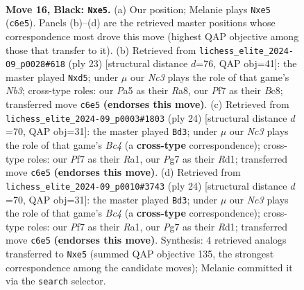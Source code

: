 \documentclass[11pt]{article}
\begin{document}
\clearpage

\begin{figure}[p]\centering
\begin{subfigure}{0.46\textwidth}\centering
\resizebox{\linewidth}{!}{%
\newchessgame
\chessboard[
  setfen={r1b1kb1r/2q2ppp/1pn5/p3P3/3p3P/1Q3N2/PP3PP1/RNB2RK1 b q - 3 16},
  showmover=false,
  pgfstyle=straightmove, color=movearrow, markmove={c6-e5}
]}
\caption{}
\end{subfigure}\hfill
\begin{subfigure}{0.46\textwidth}\centering
\resizebox{\linewidth}{!}{%
\newchessgame
\chessboard[
  setfen={r1bqkb1r/pp3ppp/1n2p3/3PN3/8/1QN5/PP3PPP/R1B1K2R b KQkq - 0 12},
  showmover=false,
  pgfstyle=straightmove, color=movearrow, markmove={b6-d5}
]}
\caption{}
\end{subfigure}
\\[4pt]
\begin{subfigure}{0.46\textwidth}\centering
\resizebox{\linewidth}{!}{%
\newchessgame
\chessboard[
  setfen={rn3rk1/pbq2ppp/1p2pn2/8/2BP4/2P2N2/P3QPPP/R1BR2K1 w - - 1 13},
  showmover=false,
  pgfstyle=straightmove, color=movearrow, markmove={c4-d3}
]}
\caption{}
\end{subfigure}\hfill
\begin{subfigure}{0.46\textwidth}\centering
\resizebox{\linewidth}{!}{%
\newchessgame
\chessboard[
  setfen={rn3rk1/pbq2ppp/1p2pn2/8/2BP4/2P2N2/P3QPPP/R1BR2K1 w - - 1 13},
  showmover=false,
  pgfstyle=straightmove, color=movearrow, markmove={c4-d3}
]}
\caption{}
\end{subfigure}
\caption{\textbf{Move 16, Black: \texttt{Nxe5}.} (a) Our position; Melanie plays \texttt{Nxe5} (\texttt{c6e5}). Panels (b)--(d) are the retrieved master positions whose correspondence most drove this move (highest QAP objective among those that transfer to it). (b) Retrieved from \texttt{lichess\_elite\_2024-09\_p0028\#618} (ply 23) [structural distance $d$=76, QAP obj=41]: the master played \texttt{Nxd5}; under $\mu$ our \emph{Nc3} plays the role of that game's \emph{Nb3}; cross-type roles: our \emph{P}a5 as their \emph{R}a8, our \emph{P}f7 as their \emph{B}c8; transferred move \texttt{c6e5} \textbf{(endorses this move)}. (c) Retrieved from \texttt{lichess\_elite\_2024-09\_p0003\#1803} (ply 24) [structural distance $d$=70, QAP obj=31]: the master played \texttt{Bd3}; under $\mu$ our \emph{Nc3} plays the role of that game's \emph{Bc4} (a \textbf{cross-type} correspondence); cross-type roles: our \emph{P}f7 as their \emph{R}a1, our \emph{P}g7 as their \emph{R}d1; transferred move \texttt{c6e5} \textbf{(endorses this move)}. (d) Retrieved from \texttt{lichess\_elite\_2024-09\_p0010\#3743} (ply 24) [structural distance $d$=70, QAP obj=31]: the master played \texttt{Bd3}; under $\mu$ our \emph{Nc3} plays the role of that game's \emph{Bc4} (a \textbf{cross-type} correspondence); cross-type roles: our \emph{P}f7 as their \emph{R}a1, our \emph{P}g7 as their \emph{R}d1; transferred move \texttt{c6e5} \textbf{(endorses this move)}. Synthesis: 4 retrieved analogs transferred to \texttt{Nxe5} (summed QAP objective 135, the strongest correspondence among the candidate moves); Melanie committed it via the \texttt{search} selector.}
\label{fig:thought-m31}
\end{figure}
\end{document}
